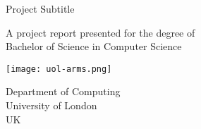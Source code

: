\makeatletter
\begin{titlepage}
   \begin{center}
       \vspace*{1cm}

       \Huge
       \textbf{\@title}

       \vspace{0.5cm}
       \Large
       Project Subtitle
            
       \vspace{1.5cm}

       \textbf{\@author}

       \vfill
            
       A project report presented for the degree of\\
       Bachelor of Science in Computer Science
            
       \vspace{0.8cm}
     
       \texttt{[image: uol-arms.png]}
            
       \Large
       Department of Computing\\
       University of London\\
       UK\\
       \@date
       
   \end{center}
\end{titlepage}
\makeatother
